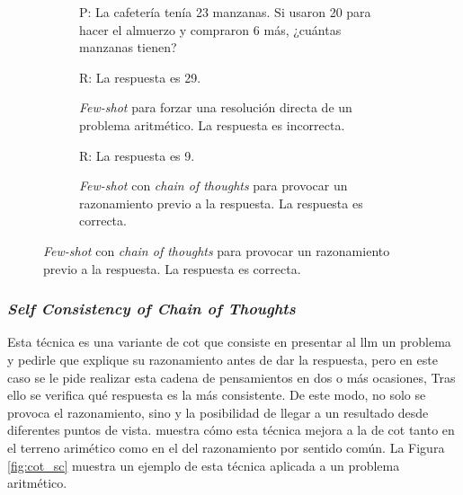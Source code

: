 \begin{figure}[H]
\begin{subfigure}{.48\textwidth}
\begin{mdframed}
        P: La cafetería tenía 23 manzanas. Si usaron 20 para hacer el almuerzo y compraron 6 más, ¿cuántas manzanas tienen?
        \vspace{0.2cm}
      \end{mdframed}
    \end{subfigure}

    \vspace{0.2cm}

    \begin{subfigure}{.48\textwidth}
        \centering
        \begin{mdframed}
        R: La respuesta es 29.
        \end{mdframed}
        \caption{\emph{Few-shot} para forzar una resolución directa de un problema aritmético. La respuesta es incorrecta.}
      \end{subfigure}\hfill
    \begin{subfigure}{.48\textwidth}
      \centering
      \begin{mdframed}
        R:  La respuesta es 9.
      \end{mdframed}
      \caption{\emph{Few-shot} con \emph{chain of thoughts} para provocar un razonamiento previo a la respuesta. La respuesta es correcta.}
    \end{subfigure}

    \label{fig:chain_of_thoughts}
\end{figure}

\subsubsection{\emph{Self Consistency of Chain of Thoughts}}

Esta técnica es una variante de \gls{cot} que consiste en presentar al \gls{llm} un problema y pedirle que explique su razonamiento antes de dar la respuesta, pero en este caso se le pide realizar esta cadena de pensamientos en dos o más ocasiones, Tras ello se verifica qué respuesta es la más consistente. De este modo, no solo se provoca el razonamiento, sino y la posibilidad de llegar a un resultado desde diferentes puntos de vista. \citep{wangSelfConsistencyImprovesChain2023} muestra cómo esta técnica mejora a la de \gls{cot} tanto en el terreno arimético como en el del razonamiento por sentido común. La Figura \ref{fig:cot_sc} muestra un ejemplo de esta técnica aplicada a un problema aritmético.

